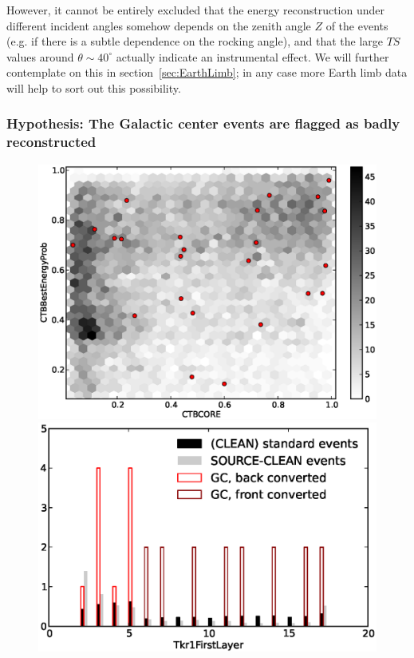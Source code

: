 \documentclass[aps,twocolumn,prd,superscriptaddress,showpacs,nofootinbib,fixfloat]{revtex4}
\begin{document}
However, it cannot be entirely excluded that the energy reconstruction under
different incident angles somehow depends on the zenith angle $Z$ of the
events (e.g. if there is a subtle dependence on the rocking angle), and that
the large $TS$ values around $\theta\sim40^\circ$ actually indicate an
instrumental effect. We will further contemplate on this in
section~\ref{sec:EarthLimb}; in any case more Earth limb data will help to
sort out this possibility.

\subsubsection{Hypothesis: The Galactic center events are flagged as badly
reconstructed}

\begin{figure}
  \centering
  \includegraphics[width=1.00\linewidth]{plots/CTBCORE_CTBBestEnergyProb.eps}
  \includegraphics[width=1.00\linewidth]{plots/Tkr1FirstLayer.eps}

\end{figure}
\end{document}
